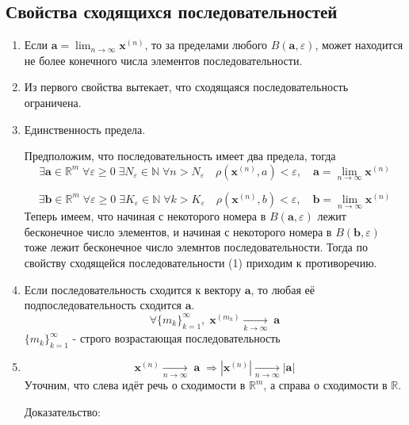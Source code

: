 \subsection{Свойства сходящихся последовательностей}
\begin{enumerate} 
  \item 
  Если $\textbf {a} = \lim_{n\to\infty}{\textbf{x}^{(n)}}$, то за пределами любого $B(\textbf {a}, \varepsilon)$, может находится не более конечного числа элементов последовательности.
  \item
  Из первого свойства вытекает, что сходящаяся последовательность ограничена.
  \item
  Единственность предела.
  
  Предположим, что последовательность имеет два предела, тогда 
$$
\exists \textbf {a} \in \mathbb {R}^m \; \forall \varepsilon \geq 0 \; \exists N_{\varepsilon} \in \mathbb {N} \; \forall n > N_{\varepsilon} \quad \rho(\textbf{x}^{(n)}, a) < {\varepsilon}, \quad \textbf {a} = \lim_{n\to\infty}{\textbf{x}^{(n)}}
$$

$$
\exists \textbf {b} \in \mathbb {R}^m \; \forall \varepsilon \geq 0 \; \exists K_{\varepsilon} \in \mathbb {N} \; \forall k > K_{\varepsilon} \quad \rho(\textbf{x}^{(n)}, b) < {\varepsilon}, \quad \textbf {b} = \lim_{n\to\infty}{\textbf{x}^{(n)}}
$$
Теперь имеем, что начиная с некоторого номера в $B(\textbf {a}, \varepsilon)$ лежит бесконечное число элементов, и начиная с некоторого номера в $B(\textbf {b}, \varepsilon)$ тоже лежит бесконечное число элемнтов последовательности. Тогда по свойству сходящейся последовательности (1) приходим к противоречию.
  \item
  Если последовательность сходится к вектору $\textbf {a}$, то любая её подпоследовательность сходится $\textbf {a}$.
  $$
  \forall \{m_k\}^{\infty}_{k=1}, \; \textbf {x}^{(m_k)} \underset{k \to \infty}{\longrightarrow} \; \textbf {a}
  $$
  $\{m_k\}^{\infty}_{k=1}$ - строго возрастающая последовательность
  \item
  $$
  \textbf {x}^{(n)} \underset{n \to \infty}{\longrightarrow} \; \textbf {a} \; \Rightarrow |\textbf {x}^{(n)}| \underset{n \to \infty}{\longrightarrow} |\textbf {a}|
  $$
  Уточним, что слева идёт речь о сходимости в $\mathbb {R}^m$, а справа о сходимости в $\mathbb {R}$.
  
  Доказательство:
  

\end{enumerate}
